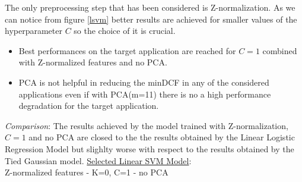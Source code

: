 \documentclass[10pt, a4paper, twocolumn]{article} %
\begin{document}
The only preprocessing step that has been considered is Z-normalization. As we can notice from figure \ref{lsvm}
better results are achieved for smaller values of the hyperparameter $C$ so the choice of it is crucial.
\begin{itemize}
	\item Best performances on the target application are reached for $C=1$ combined with
		  Z-normalized features and no PCA.
	\item PCA is not helpful in reducing the minDCF in any of the considered applications
		  even if with PCA(m=11) there is no a high performance degradation for the target
		  application.
\end{itemize}
\textit{Comparison}: The results achieved by the model trained with Z-normalization, 
$C=1$ and no PCA are closed to the the results obtained by the Linear Logistic Regression Model
but slighlty worse with respect to the results obtained by the Tied Gaussian model.
\underline{Selected Linear SVM Model}: \\Z-normalized features - K=0, C=1 - no PCA
\end{document}
